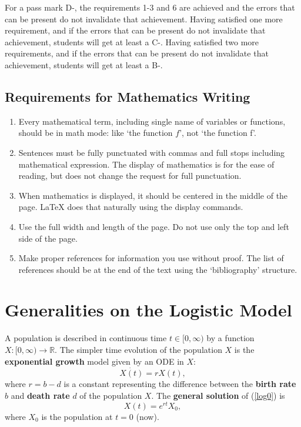 \documentclass[12pt]{article}
\def\R{\mathbb{R}}
\newcommand{\be}{\begin{equation}}
\newcommand{\ee}{\end{equation}}
\begin{document}
For a pass mark D-, the requirements 1-3 and 6 are achieved and the errors that can be present
do not invalidate that achievement. Having satisfied one more requirement, and if the errors that
can be present do not invalidate that achievement, students will get at least a C-.
Having satisfied two more requirements, and if the errors that can be present do not invalidate
that achievement, students will get at least a B-.

\subsection{Requirements for Mathematics Writing}\label{sec1.3}

\begin{enumerate}\item Every mathematical term, including single name of variables or functions, should
be in math mode: like `the function $f$', not `the function f'.
\item Sentences must be fully punctuated with commas and full stops including mathematical expression.
The display of mathematics is for the ease of reading, but does not change the request
for full punctuation.
\item When mathematics is displayed, it should be centered in the middle of the page. \LaTeX
does that naturally using the display commands.
\item Use the full width and length of the page. Do not use only the top and left side of the page.
\item Make proper references for information you use without proof. The list of references should be
at the end of the text using the `bibliography' structure. \end{enumerate}

\newpage

\section{Generalities on the Logistic Model}

A population is described in continuous time $t\in[0,\infty)$ by a function $X:[0,\infty)\to\R$.
The simpler time evolution of the population $X$ is the {\bf\red exponential growth} model
given by an ODE in $X$:
\be \dot{X(t)}=r X(t), \label{log0}\ee
where $r=b-d$ is a constant representing the difference between the {\bf\red birth rate} $b$
and {\bf\red death rate} $d$ of the population $X$. The {\bf\red general solution} of (\ref{log0}) is
$$ X(t)=e^{rt}X_0, $$
where $X_0$ is the population at $t=0$ (now).
\end{document}
